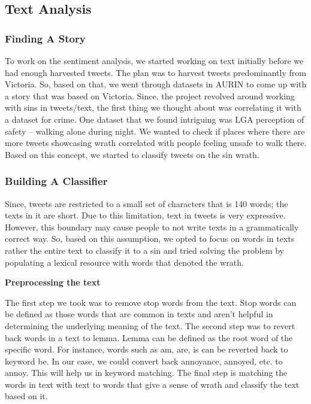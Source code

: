 \subsection{Text Analysis}

\subsubsection{Finding A Story}

To work on the sentiment analysis, we started working on text initially before we had enough harvested tweets. The plan was to harvest tweets predominantly from Victoria. So, based on that, we went through datasets in AURIN to come up with a story that was based on Victoria. Since, the project revolved around working with sins in tweets/text, the first thing we thought about was correlating it with a dataset for crime. One dataset that we found intriguing was LGA perception of safety – walking alone during night. We wanted to check if places where there are more tweets showcasing wrath correlated with people feeling unsafe to walk there. Based on this concept, we started to classify tweets on the sin wrath.

\subsubsection{Building A Classifier}

Since, tweets are restricted to a small set of characters that is 140 words; the texts in it are short. Due to this limitation, text in tweets is very expressive. However, this boundary may cause people to not write texts in a grammatically correct way. So, based on this assumption, we opted to focus on words in texts rather the entire text to classify it to a sin and tried solving the problem by populating a lexical resource with words that denoted the wrath. 

{\bf Preprocessing the text}


The first step we took was to remove stop words from the text. Stop words can be defined as those words that are common in texts and aren’t helpful in determining the underlying meaning of the text. The second step was to revert back words in a text to lemma. Lemma can be defined as the root word of the specific word. For instance, words such as am, are, is can be reverted back to keyword be. In our case, we could convert back annoyance, annoyed, etc. to annoy. This will help us in keyword matching. The final step is matching the words in text with text to words that give a sense of wrath and classify the text based on it. 

